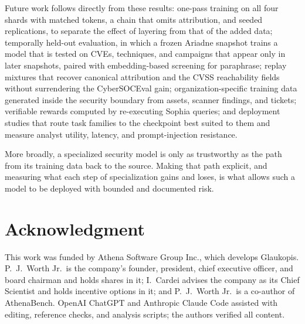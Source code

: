 \documentclass[conference]{IEEEtran}
\begin{document}
Future work follows directly from these results: one-pass training on all four shards with matched tokens, a chain that omits attribution, and seeded replications, to separate the effect of layering from that of the added data; temporally held-out evaluation, in which a frozen Ariadne snapshot trains a model that is tested on CVEs, techniques, and campaigns that appear only in later snapshots, paired with embedding-based screening for paraphrase; replay mixtures that recover canonical attribution and the CVSS reachability fields without surrendering the CyberSOCEval gain; organization-specific training data generated inside the security boundary from assets, scanner findings, and tickets; verifiable rewards computed by re-executing Sophia queries; and deployment studies that route task families to the checkpoint best suited to them and measure analyst utility, latency, and prompt-injection resistance.

More broadly, a specialized security model is only as trustworthy as the path from its training data back to the source. Making that path explicit, and measuring what each step of specialization gains and loses, is what allows such a model to be deployed with bounded and documented risk.

\section*{Acknowledgment}
This work was funded by Athena Software Group Inc., which develops Glaukopis. P.~J.~Worth Jr.\ is the company's founder, president, chief executive officer, and board chairman and holds shares in it; I.~Cardei advises the company as its Chief Scientist and holds incentive options in it; and P.~J.~Worth Jr.\ is a co-author of AthenaBench. OpenAI ChatGPT and Anthropic Claude Code assisted with editing, reference checks, and analysis scripts; the authors verified all content.



\end{document}
